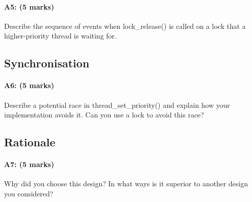 \paragraph{A5: (5 marks)}
Describe the sequence of events when lock\_release() is called on a lock that a higher-priority thread is waiting for.

\subsection{Synchronisation}
\paragraph{A6: (5 marks)}
Describe a potential race in thread\_set\_priority() and explain how your implementation avoids it.  Can you use a lock to avoid this race?

\subsection{Rationale}
\paragraph{A7: (5 marks)}
Why did you choose this design?  In what ways is it superior to another design you considered?